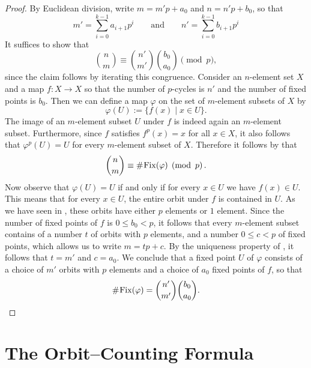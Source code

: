 \begin{proof}
  By Euclidean division, write $m= m'p+a_0$ and $n=n'p+b_0$, so that 
  \begin{equation*}
    m'=\sum_{i=0}^{k-1}a_{i+1}p^i\qquad\text{and}\qquad n'=\sum_{i=0}^{k-1}b_{i+1}p^i
  \end{equation*}
  It suffices to show that
  \begin{equation*}
    \binom{n}{m}\equiv \binom{n'}{m'}\binom{b_0}{a_0}\pmod{p},
  \end{equation*}
  since the claim follows by iterating this congruence. Consider an $n$-element set $X$ and a map $f:X\to X$ so that the number of $p$-cycles is $n'$ and the number of fixed points is $b_0$. Then we can define a map $\varphi$ on the set of $m$-element subsets of $X$ by
  \begin{equation*}
    \varphi(U):=\{f(x)\mid x\in U\}.
  \end{equation*}
  The image of an $m$-element subset $U$ under $f$ is indeed again an $m$-element subset. Furthermore, since $f$ satisfies $f^p(x)=x$ for all $x\in X$, it also follows that $\varphi^p(U)=U$ for every $m$-element subset of $X$. Therefore it follows by  that
  \begin{equation*}
    \binom{n}{m}\equiv \mathord{\#}\mkern1mu \mathrm{Fix}(\varphi) \mkern5mu\left(\operatorname{mod} \mkern 6mu p\right).
  \end{equation*}
  Now observe that $\varphi(U)=U$ if and only if for every $x\in U$ we have $f(x)\in U$. This means that for every $x\in U$, the entire orbit under $f$ is contained in $U$. As we have seen in , these orbits have either $p$ elements or $1$ element. Since the number of fixed points of $f$ is $0\leq b_0<p$, it follows that every $m$-element subset contains of a number $t$ of orbits with $p$ elements, and a number $0\leq c<p$ of fixed points, which allows us to write $m=tp+c$. By the uniqueness property of , it follows that $t=m'$ and $c=a_0$. We conclude that a fixed point $U$ of $\varphi$ consists of a choice of $m'$ orbits with $p$ elements and a choice of $a_0$ fixed points of $f$, so that
  \begin{equation*}
    \mathord{\#}\mkern1mu \mathrm{Fix}(\varphi)=\binom{n'}{m'}\binom{b_0}{a_0}.\qedhere
  \end{equation*}
\end{proof}

\section{The Orbit--Counting Formula}

